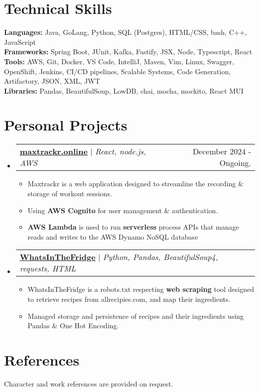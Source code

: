 \documentclass[letterpaper,11pt]{article}
\makeatletter
\newcommand{\resumeItem}[1]{
  \item\small{
    {#1 \vspace{-2pt}}
  }
}
\newcommand{\resumeProjectHeading}[2]{
    \item
    \begin{tabular*}{0.97\textwidth}{l@{\extracolsep{\fill}}r}
      \small#1 & #2 \\
    \end{tabular*}\vspace{-7pt}
}
\newcommand{\resumeSubHeadingListStart}{\begin{itemize}[leftmargin=0.15in, label={}]}
\newcommand{\resumeSubHeadingListEnd}{\end{itemize}}
\newcommand{\resumeItemListStart}{\begin{itemize}\vspace{0pt}}
\newcommand{\resumeItemListEnd}{\end{itemize}\vspace{0pt}}
\makeatother
\begin{document}
\section{Technical Skills}
 \begin{itemize}[leftmargin=0.15in, label={}]
    \small{\item{
     \textbf{Languages: }{Java, GoLang, Python, SQL (Postgres), HTML/CSS, bash, C++, JavaScript} \\
     \textbf{Frameworks: }{Spring Boot, JUnit, Kafka, Fastify, JSX, Node, Typescript, React} \\
     \textbf{Tools: }{AWS, Git, Docker, VS Code, IntelliJ, Maven, Vim, Linux, Swagger, OpenShift, Jenkins, CI/CD pipelines, Scalable Systems, Code Generation, Artifactory, JSON, XML, JWT} \\
     \textbf{Libraries: }{Pandas, BeautifulSoup, LowDB, chai, mocha, mockito, React MUI}
    }}
\end{itemize}

\section{Personal Projects}
    \resumeSubHeadingListStart
      \resumeProjectHeading
        {\textbf{\href{https://maxtrackr.online}{\underline{maxtrackr.online}}{\vspace{5pt}}} $|$ \emph{React, node.js, AWS}}{December 2024 - Ongoing.}
          \resumeItemListStart
              \resumeItem{Maxtrackr is a web application designed to streamline the recording \& storage of workout sessions.}
              \resumeItem{Using \textbf{AWS Cognito} for user management \& authentication.}
              \resumeItem{\textbf{AWS Lambda} is used to run \textbf{serverless} process APIs that manage reads and writes to the AWS Dynamo NoSQL database}
          \resumeItemListEnd    
      \resumeProjectHeading 
        {\textbf{\href{https://github.com/g-n-b/WhatsInTheFridge}{\underline{WhatsInTheFridge}}{\vspace{5pt}}} $|$ \emph{Python, Pandas, BeautifulSoup4, requests, HTML}}{}
          \resumeItemListStart
            \resumeItem{WhatsInTheFridge is a robots.txt respecting \textbf{web scraping} tool designed to retrieve recipes from allrecipies.com, and map their ingredients.}
            \resumeItem{Managed storage and persistence of recipes and their ingredients using Pandas \& One Hot Encoding.}
          \resumeItemListEnd
    \resumeSubHeadingListEnd
\section{References}
Character and work references are provided on request.
\end{document}
